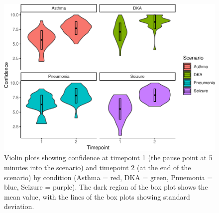 \documentclass[a4paper, nobind]{templates/ociamthesis}
\begin{document}
\begin{figure}

{\centering \includegraphics[width=1\linewidth]{04-study4_files/figure-latex/confidencetime-1} 

}

\caption[VR Study: Confidence by Timepoint and Scenario (Violin Plots)]{Violin plots showing confidence at timepoint 1 (the pause point at 5 minutes into the scenario) and timepoint 2 (at the end of the scenario) by condition (Asthma = red, DKA = green, Pnuemonia = blue, Seizure = purple). The dark region of the box plot shows the mean value, with the lines of the box plots showing standard deviation.}\label{fig:confidencetime}
\end{figure}
\end{document}

